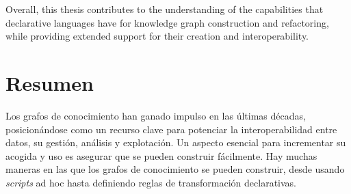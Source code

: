 Overall, this thesis contributes to the understanding of the capabilities that declarative languages have for knowledge graph construction and refactoring, while providing extended support for their creation and interoperability. 








\cleardoublepage
\section*{Resumen}
\label{sec::resumen}



Los grafos de conocimiento han ganado impulso en las últimas décadas, posicionándose como un recurso clave para potenciar la interoperabilidad entre datos, su gestión, análisis y explotación. Un aspecto esencial para incrementar su acogida y uso es asegurar que se pueden construir fácilmente. Hay muchas maneras en las que los grafos de conocimiento se pueden construir, desde usando \textit{scripts} ad hoc hasta definiendo reglas de transformación declarativas. 

